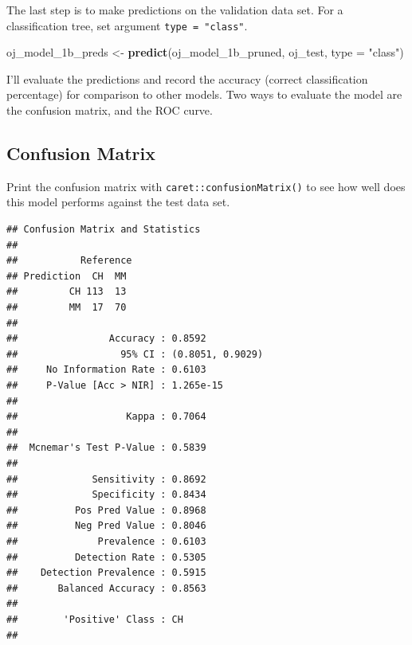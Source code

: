 \documentclass[
]{book}
\newenvironment{Shaded}{\begin{snugshade}}{\end{snugshade}}
\newcommand{\DataTypeTok}[1]{\textcolor[rgb]{0.13,0.29,0.53}{#1}}
\newcommand{\KeywordTok}[1]{\textcolor[rgb]{0.13,0.29,0.53}{\textbf{#1}}}
\newcommand{\NormalTok}[1]{#1}
\newcommand{\OperatorTok}[1]{\textcolor[rgb]{0.81,0.36,0.00}{\textbf{#1}}}
\newcommand{\StringTok}[1]{\textcolor[rgb]{0.31,0.60,0.02}{#1}}
\begin{document}
The last step is to make predictions on the validation data set. For a classification tree, set argument \texttt{type\ =\ "class"}.

\begin{Shaded}
\begin{Highlighting}[]
\NormalTok{oj_model_1b_preds <-}\StringTok{ }\KeywordTok{predict}\NormalTok{(oj_model_1b_pruned, oj_test, }\DataTypeTok{type =} \StringTok{"class"}\NormalTok{)}
\end{Highlighting}
\end{Shaded}

I'll evaluate the predictions and record the accuracy (correct classification percentage) for comparison to other models. Two ways to evaluate the model are the confusion matrix, and the ROC curve.

\hypertarget{confusion-matrix}{%
\subsection{Confusion Matrix}\label{confusion-matrix}}

Print the confusion matrix with \texttt{caret::confusionMatrix()} to see how well does this model performs against the test data set.

\begin{Shaded}
\end{Shaded}

\begin{verbatim}
## Confusion Matrix and Statistics
## 
##           Reference
## Prediction  CH  MM
##         CH 113  13
##         MM  17  70
##                                           
##                Accuracy : 0.8592          
##                  95% CI : (0.8051, 0.9029)
##     No Information Rate : 0.6103          
##     P-Value [Acc > NIR] : 1.265e-15       
##                                           
##                   Kappa : 0.7064          
##                                           
##  Mcnemar's Test P-Value : 0.5839          
##                                           
##             Sensitivity : 0.8692          
##             Specificity : 0.8434          
##          Pos Pred Value : 0.8968          
##          Neg Pred Value : 0.8046          
##              Prevalence : 0.6103          
##          Detection Rate : 0.5305          
##    Detection Prevalence : 0.5915          
##       Balanced Accuracy : 0.8563          
##                                           
##        'Positive' Class : CH              
## 
\end{verbatim}
\end{document}
